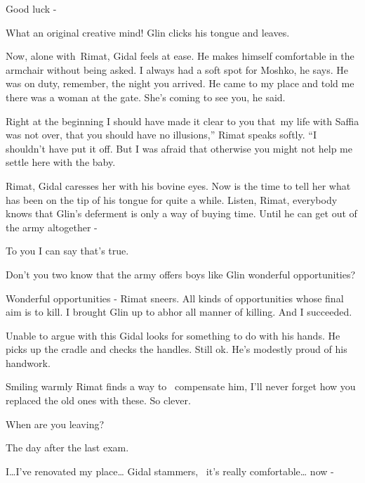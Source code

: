 \documentclass[letterpaper]{article}
\begin{document}
{\textquotedbl}Good luck -{\textquotedbl} 

{\textquotedbl}What an original creative mind!{\textquotedbl} Glin clicks his tongue and leaves.

Now, alone with~Rimat, Gidal feels at ease. He makes himself comfortable in the armchair without being asked.
{\textquotedbl}I always had a soft spot for Moshko,{\textquotedbl} he says. {\textquotedbl}He was on duty, remember,
the night you arrived. He came to my place and told me there was a woman at the gate. She's coming to see you, he
said.{\textquotedbl} 

{\textquotedbl}Right at the beginning I should have made it clear to you that~my life with Saffia was not over, that you
should have no illusions,'' Rimat speaks softly. ``I shouldn't have put it off. But I was afraid that otherwise you
might not help me settle here with the baby.{\textquotedbl} 

{\textquotedbl}Rimat,{\textquotedbl} Gidal caresses her with his bovine eyes. Now is the time to tell her what has been
on the tip of his tongue for quite{ }a while. {\textquotedbl}Listen, Rimat, everybody knows that Glin's
deferment is only a way of buying time. Until he can get out of the army altogether -{\textquotedbl} 

{\textquotedbl}To you I can say that's true.{\textquotedbl} 

{\textquotedbl}Don't you two know that the army offers boys like Glin wonderful opportunities?{\textquotedbl} 

{\textquotedbl}Wonderful opportunities -{\textquotedbl} Rimat sneers. {\textquotedbl}All kinds of opportunities whose
final aim is to kill. I brought Glin up to abhor all manner of killing. And I succeeded.{\textquotedbl}

Unable to argue with this Gidal looks for something to do with his hands. He picks up the cradle and checks the handles.
Still ok. He's modestly proud of his handwork. 

Smiling warmly Rimat finds a way to \ compensate him, {\textquotedbl}I'll never forget how you replaced the old ones
with these. So clever.{\textquotedbl} 

{\textquotedbl}When are you leaving?{\textquotedbl} 

{\textquotedbl}The day after the last exam.{\textquotedbl} 

{\textquotedbl}I{\dots}I've renovated my place{\dots}{\textquotedbl} Gidal stammers,~{\textquotedbl} it's really
comfortable{\dots} now - {\textquotedbl} 
\end{document}
